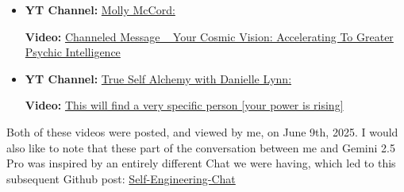{\begin{itemize}
    \item \textbf{YT Channel:} \href{https://www.youtube.com/@MollyMcCordAstrology}{Molly McCord:}
    \begin{itemize}
        \textbf{Video:} \href{https://www.youtube.com/watch?v=FYazWpLUmyU}{Channeled Message ~ Your Cosmic Vision: Accelerating To Greater Psychic Intelligence}
    \end{itemize}
    \item \textbf{YT Channel:} \href{https://www.youtube.com/@alchemydragon}{True Self Alchemy with Danielle Lynn:} 
    \begin{itemize}
        \textbf{Video:} \href{https://www.youtube.com/watch?v=rCFJwV9esGM}{This will find a very specific person [your power is rising]}
    \end{itemize}
\end{itemize}

Both of these videos were posted, and viewed by me, on June 9th, 2025. I would also like to note that these part of the conversation between me and Gemini 2.5 Pro was inspired by an entirely different Chat we were having, which led to this subsequent Github post: \href{https://github.com/whitelotusapps/Gemini-2.5-Pro-Preview/blob/main/README.md}{Self-Engineering-Chat}}




